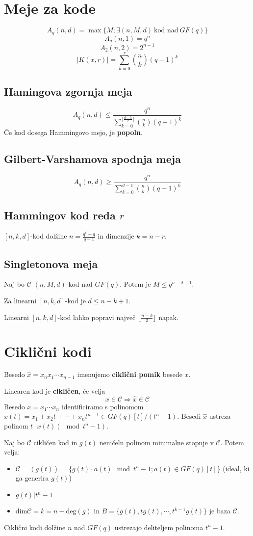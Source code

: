 \begin{multicols}{5}
\section{Meje za kode}
\[ A_q(n, d) = \max\{M; \exists (n,M,d)\ \text{kod nad}\ GF(q)\}\]
\[ A_q(n,1) = q^n\]
\[ A_2(n,2) = 2^{n-1}\]
\[|K(x,r)|=\sum_{k=0}^r\binom{n}{k}(q-1)^k\]
\subsection{Hamingova zgornja meja}
\[A_q(n,d) \le \frac{q^n}{\sum_{k=0}^{\lfloor\frac{d-1}{2}\rfloor}\binom{n}{k}(q-1)^k}\]
Če kod dosega Hammingovo mejo, je \textbf{popoln}.
\subsection{Gilbert-Varshamova spodnja meja}
\[A_q(n,d) \ge \frac{q^n}{\sum_{k=0}^{d-1}\binom{n}{k}(q-1)^k}\]
\subsection{Hammingov kod reda $r$}
$[n,k,d]$-kod dolžine $n=\frac{q^r-q}{q-1}$ in dimenzije $k = n-r$.
\subsection{Singletonova meja}
Naj bo $\mathcal{C}$ $(n,M,d)$-kod nad $GF(q)$. Potem je $M \le q^{n-d+1}$.


Za linearni $[n,k,d]$-kod je $d\le n-k+1$.

Linearni $[n,k,d]$-kod lahko popravi največ $\lfloor\frac{n-k}{2}\rfloor$ napak.
\section{Ciklični kodi}
Besedo $\hat{x} =x_nx_1\cdots x_{n-1}$ imenujemo \textbf{ciklični pomik} besede $x$.

Linearen kod je \textbf{cikličen}, če velja
\[x\in\mathcal{C}\Rightarrow\hat{x}\in\mathcal{C}\]
Besedo $x=x_1\cdots x_n$ identificiramo s polinomom $x(t) = x_1+x_2t+\cdots +x_nt^{n-1}\in GF(q)[t]/(t^n-1)$.
Besedi $\hat{x}$ ustreza polinom $t\cdot x(t)(\mod t^n-1)$.

Naj bo $\mathcal{C}$ cikličen kod in $g(t)$ neničeln polinom minimalne stopnje v $\mathcal{C}$.
Potem velja:
\begin{itemize}
	\item $\mathcal{C} = \left<g(t)\right> = \{g(t)\cdot a(t) \mod t^n-1; a(t)\in GF(q)[t]\}$ (ideal, ki ga generira $g(t)$)
	\item $g(t)|t^n-1$
	\item $\text{dim} \mathcal{C} = k = n -\text{deg}(g)$ in $B = \{g(t), tg(t),\cdots,t^{k-1}g(t)\}$ je baza $\mathcal{C}$.
\end{itemize}
Ciklični kodi dolžine $n$ nad $GF(q)$ ustrezajo deliteljem polinoma $t^n-1$.


\end{multicols}
